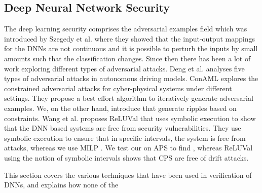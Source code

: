 \subsection{Deep Neural Network Security}

The deep learning security comprises the adversarial examples field which was introduced by Szegedy et al. \cite{Szegedy2013IntriguingPO} where they showed that the input-output mappings for the DNNs are not continuous and it is possible to perturb the inputs by small amounts such that the classification changes. Since then there has been a lot of work exploring different types of adversarial attacks. Deng et al. \cite{deng2020analysis} analyses five types of adversarial attacks in autonomous driving models.  ConAML \cite{li2020conaml} explores the constrained adversarial attacks for cyber-physical systems under different settings. They propose a best effort algorithm to iteratively generate adversarial examples. We, on the other hand, introduce \attack  that generate ripples based on constraints. Wang et al. \cite{217595} proposes ReLUVal that uses symbolic execution to show that the DNN based systems are free from security vulnerabilities. They use symbolic execution  to ensure that in specific intervals, the system is free from attacks, whereas we use MILP . We test our \tool on APS to find \attack, whereas ReLUVal using the notion of symbolic intervals shows that CPS are free of drift attacks. 

This section covers the various techniques that have been used in verification of DNNs, and explains how none of the 